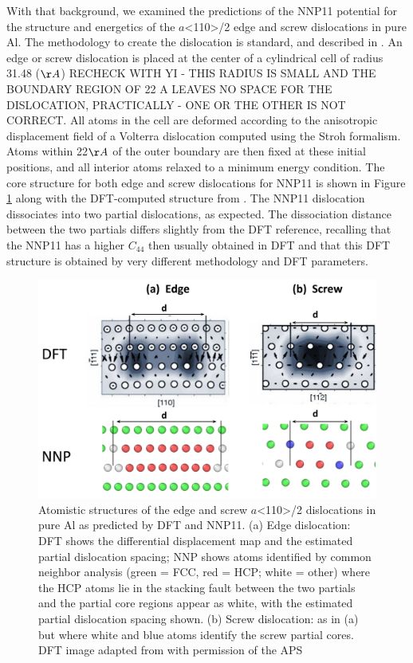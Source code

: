 \documentclass{article}
\begin{document}
With that background, we examined the predictions of the NNP11 potential for the structure and energetics of the $a$<110>/2 edge and screw dislocations in pure Al.
The methodology to create the dislocation is standard, and described in \cite{Hu2020AtomisticDynamics}.
An edge or screw dislocation is placed at the center of a cylindrical cell of radius 31.48 ($\AA$) RECHECK WITH YI - THIS RADIUS IS SMALL AND THE BOUNDARY REGION OF 22 A LEAVES NO SPACE FOR THE DISLOCATION, PRACTICALLY - ONE OR THE OTHER IS NOT CORRECT.
All atoms in the cell are deformed according to the anisotropic displacement field of a Volterra dislocation computed using the Stroh formalism\cite{Stroh1958DislocationsElasticity}.
Atoms within 22$\AA$ of the outer boundary are then fixed at these initial positions, and all interior atoms relaxed to a minimum energy condition.
The core structure for both edge and screw dislocations for NNP11 is shown in Figure \ref{fig:dislocation_NNPvsDFT} along with the DFT-computed structure from \cite{Woodward2008PredictionTheory}.
The NNP11 dislocation dissociates into two partial dislocations, as expected.
The dissociation distance between the two partials differs slightly from the DFT reference, recalling that the NNP11 has a higher $C_{44}$ then usually obtained in DFT and that this DFT structure is obtained by very different methodology and DFT parameters.

\begin{figure}[H]%
\centering%
\includegraphics[width=1\textwidth,center]{figures/dislocation_NNPvsDFT.png}%
\caption{Atomistic structures of the edge and screw $a$<110>/2 dislocations in pure Al as predicted by DFT and NNP11. (a) Edge dislocation: DFT shows the differential displacement map and the estimated partial dislocation spacing; NNP shows atoms identified by common neighbor analysis (green = FCC, red = HCP; white = other) where the HCP atoms lie in the stacking fault between the two partials and the partial core regions appear as white, with the estimated partial dislocation spacing shown. (b) Screw dislocation: as in (a) but where white and blue atoms identify the screw partial cores.
DFT image adapted from \cite{Woodward2008PredictionTheory} with permission of the APS
}%
\label{fig:dislocation_NNPvsDFT}
\end{figure}
\end{document}
